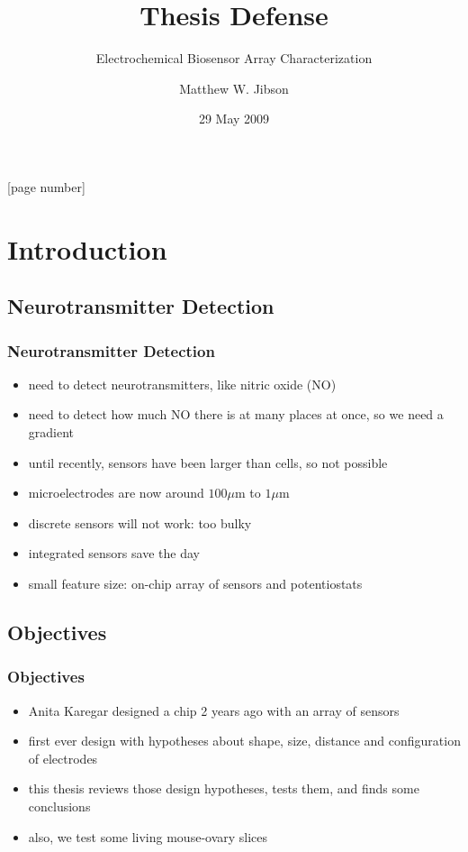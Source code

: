 \documentclass[10pt]{beamer}
\title{Thesis Defense}
\subtitle{Electrochemical Biosensor Array Characterization}
\author[M.W. Jibson]{Matthew W. Jibson}
\institute{Colorado State University}
\date{29 May 2009}
\begin{document}
[page number]

\begin{frame}
	\titlepage
\end{frame}

\section{Introduction}
\subsection{Neurotransmitter Detection}
\begin{frame}
	\frametitle{Neurotransmitter Detection}
	\begin{itemize}
		\item need to detect neurotransmitters, like nitric oxide (NO)
		\item need to detect how much NO there is at many places at once, so we need a gradient
		\item until recently, sensors have been larger than cells, so not possible
		\item microelectrodes are now around $100 \mu \mathrm{m}$ to $1 \mu \mathrm{m}$
		\item discrete sensors will not work: too bulky
		\item integrated sensors save the day
		\item small feature size: on-chip array of sensors and potentiostats
	\end{itemize}
\end{frame}

\subsection{Objectives}
\begin{frame}
	\frametitle{Objectives}
	\begin{itemize}
		\item Anita Karegar designed a chip 2 years ago with an array of sensors
		\item first ever design with hypotheses about shape, size, distance and configuration of electrodes
		\item this thesis reviews those design hypotheses, tests them, and finds some conclusions
		\item also, we test some living mouse-ovary slices
	\end{itemize}
\end{frame}
\end{document}
